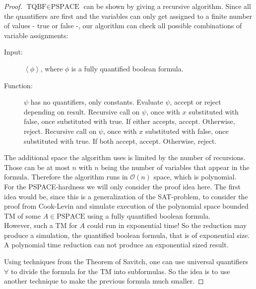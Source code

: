 \documentclass[10pt,fleqn]{article}
\theoremstyle{definition}
\theoremstyle{remark}
\newcommand{\pspaceclass}{\text{PSPACE}}
\newcommand{\tqbfprob}{\text{TQBF}}
\newcommand{\lpp}{\left \langle}
\newcommand{\rpp}{\right \rangle}
\newcommand{\enc}[1]{\lpp #1 \rpp}
\begin{document}
\begin{proof} \(\tqbfprob \in \pspaceclass\) can be shown by giving a recursive algorithm. Since all the quantifiers are first and the variables can only get assigned to a finite number of values - true or false -, our algorithm can check all possible combinations of variable assignments:
    \begin{description}
        \item[Input:] \(\enc{\phi}\), where \(\phi\) is a fully quantified boolean formula.
        \item[Function:] \phantom{}
            \begin{algorithmic}[1]
                    \State \(\psi\) has no quantifiers, only constants. Evaluate \(\psi\), accept or reject depending on result.
                    \State Recursive call on \(\psi\), once with \(x\) substituted with false, once substituted with true.
                    \State If either accepts, accept. Otherwise, reject.
                    \State Recursive call on \(\psi\), once with \(x\) substituted with false, once substituted with true.
                    \State If both accept, accept. Otherwise, reject.
                \EndIf
            \end{algorithmic}
    \end{description}
    The additional space the algorithm uses is limited by the number of recursions. Those can be at most \(n\) with \(n\) being the number of variables that appear in the formula. Therefore the algorithm runs in \(\mathcal{O}(n)\) space, which is polynomial.\\

    For the PSPACE-hardness we will only consider the proof idea here. The first idea would be, since this is a generalization of the SAT-problem, to consider the proof from Cook-Levin and simulate execution of the polynomial space bounded TM of some \(A \in \pspaceclass\) using a fully quantified boolean formula.\\
    
    However, such a TM for \(A\) could run in exponential time! So the reduction may produce a simulation, the quantified boolean formula, that is of exponential size. A polynomial time reduction can not produce an exponential sized result.

    Using techniques from the Theorem of Savitch, one can use universal quantifiers \(\forall\) to divide the formula for the TM into subformulas. So the idea is to use another technique to make the previous formula much smaller.
\end{proof}
\end{document}
